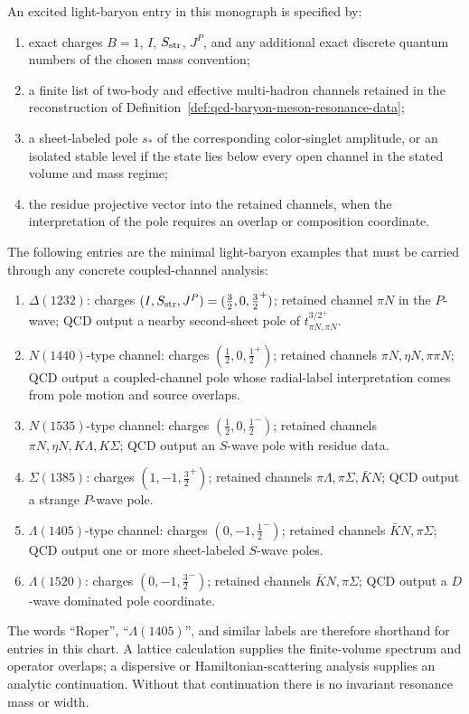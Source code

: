 \begin{definition}
\label{def:qcd-excited-light-baryon-channel-chart}
An excited light-baryon entry in this monograph is specified by:
\begin{enumerate}[label=(\roman*)]
\item exact charges \(B=1\), \(I\), \(S_{\rm str}\), \(J^P\), and any
  additional exact discrete quantum numbers of the chosen mass convention;
\item a finite list of two-body and effective multi-hadron channels retained
  in the reconstruction of Definition~\ref{def:qcd-baryon-meson-resonance-data};
\item a sheet-labeled pole \(s_\ast\) of the corresponding color-singlet
  amplitude, or an isolated stable level if the state lies below every open
  channel in the stated volume and mass regime;
\item the residue projective vector into the retained channels, when the
  interpretation of the pole requires an overlap or composition coordinate.
\end{enumerate}
The following entries are the minimal light-baryon examples that must be
carried through any concrete coupled-channel analysis:
\begin{enumerate}[label=(\alph*)]
\item \(\Delta(1232)\): charges
  \((I,S_{\rm str},J^P)=(\frac32,0,\frac32^+)\); retained channel
  \(\pi N\) in the \(P\)-wave; QCD output a nearby second-sheet pole of
  \(t_{\pi N,\pi N}^{3/2^+}\).
\item \(N(1440)\)-type channel: charges
  \((\frac12,0,\frac12^+)\); retained channels
  \(\pi N,\eta N,\pi\pi N\); QCD output a coupled-channel pole whose
  radial-label interpretation comes from pole motion and source overlaps.
\item \(N(1535)\)-type channel: charges
  \((\frac12,0,\frac12^-)\); retained channels
  \(\pi N,\eta N,K\Lambda,K\Sigma\); QCD output an \(S\)-wave pole with
  residue data.
\item \(\Sigma(1385)\): charges \((1,-1,\frac32^+)\); retained channels
  \(\pi\Lambda,\pi\Sigma,\bar K N\); QCD output a strange \(P\)-wave pole.
\item \(\Lambda(1405)\)-type channel: charges \((0,-1,\frac12^-)\);
  retained channels \(\bar K N,\pi\Sigma\); QCD output one or more
  sheet-labeled \(S\)-wave poles.
\item \(\Lambda(1520)\): charges \((0,-1,\frac32^-)\); retained channels
  \(\bar K N,\pi\Sigma\); QCD output a \(D\)-wave dominated pole coordinate.
\end{enumerate}
The words ``Roper'', ``\(\Lambda(1405)\)'', and similar labels are therefore
shorthand for entries in this chart.  A lattice calculation supplies the
finite-volume spectrum and operator overlaps; a dispersive or
Hamiltonian-scattering analysis supplies an analytic continuation.  Without
that continuation there is no invariant resonance mass or width.
\end{definition}


